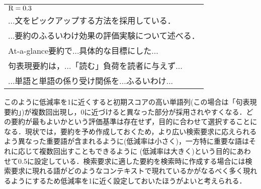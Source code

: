 \bigskip
{\bf
\begin{tabular}{l}
 ${\rm R} = 0.3$ \\
 ...文をピックアップする方法を採用している．\\
 ...要約のふるいわけ効果の評価実験について述べる．\\
 At-a-glance要約で...具体的な目標にした... \\
 句表現要約は，...「読む」負荷を読者に与えず... \\
 ...単語と単語の係り受け関係を...ふるいわけ...
\end{tabular}
}

\vspace{2zw}

このように低減率を1に近くすると初期スコアの高い単語列(この場合は「句表現要約」)が複数回出現し，0に近づけると異なった部分が採用されやすくなる．どの要約が最もよいかという評価基準は存在せず，目的に合わせて選択することになる．現状では，要約を予め作成しておくため，より広い検索要求に応えられるよう異なった重要語が含まれるように(低減率は小さく)，一方特に重要な語はそれに応じて複数回出すこともできるように (低減率は大きく)という目的にあわせて0.5に設定している．検索要求に適した要約を検索時に作成する場合には検索要求に現れる語がどのようなコンテキストで現れているかがなるべく多く現れるようにするため低減率を1に近く設定しておいたほうがよいと考えられる．

\vspace{.5zw}

\begin{biography}




\end{biography}


